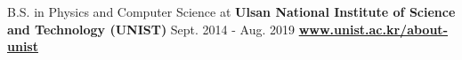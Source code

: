 \cveventeducation
{B.S. in Physics and Computer Science at }
{\textbf{Ulsan National Institute of Science and Technology (UNIST)}}
{Sept. 2014 - Aug. 2019}
{
    \href{https://www.unist.ac.kr/about-unist/}{\textbf{www.unist.ac.kr/about-unist}}
}
